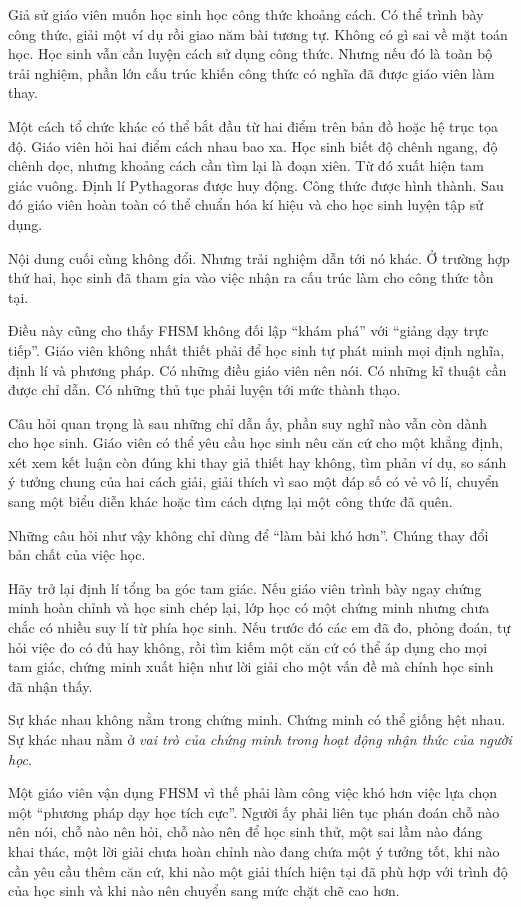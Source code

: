Giả sử giáo viên muốn học sinh học công thức khoảng cách. Có thể trình bày công thức, giải một ví dụ rồi giao năm bài tương tự. Không có gì sai về mặt toán học. Học sinh vẫn cần luyện cách sử dụng công thức. Nhưng nếu đó là toàn bộ trải nghiệm, phần lớn cấu trúc khiến công thức có nghĩa đã được giáo viên làm thay.

Một cách tổ chức khác có thể bắt đầu từ hai điểm trên bản đồ hoặc hệ trục tọa độ. Giáo viên hỏi hai điểm cách nhau bao xa. Học sinh biết độ chênh ngang, độ chênh dọc, nhưng khoảng cách cần tìm lại là đoạn xiên. Từ đó xuất hiện tam giác vuông. Định lí Pythagoras được huy động. Công thức được hình thành. Sau đó giáo viên hoàn toàn có thể chuẩn hóa kí hiệu và cho học sinh luyện tập sử dụng.

Nội dung cuối cùng không đổi. Nhưng trải nghiệm dẫn tới nó khác. Ở trường hợp thứ hai, học sinh đã tham gia vào việc nhận ra cấu trúc làm cho công thức tồn tại.

Điều này cũng cho thấy FHSM không đối lập ``khám phá'' với ``giảng dạy trực tiếp''. Giáo viên không nhất thiết phải để học sinh tự phát minh mọi định nghĩa, định lí và phương pháp. Có những điều giáo viên nên nói. Có những kĩ thuật cần được chỉ dẫn. Có những thủ tục phải luyện tới mức thành thạo.

Câu hỏi quan trọng là sau những chỉ dẫn ấy, phần suy nghĩ nào vẫn còn dành cho học sinh. Giáo viên có thể yêu cầu học sinh nêu căn cứ cho một khẳng định, xét xem kết luận còn đúng khi thay giả thiết hay không, tìm phản ví dụ, so sánh ý tưởng chung của hai cách giải, giải thích vì sao một đáp số có vẻ vô lí, chuyển sang một biểu diễn khác hoặc tìm cách dựng lại một công thức đã quên.

Những câu hỏi như vậy không chỉ dùng để ``làm bài khó hơn''. Chúng thay đổi bản chất của việc học.

Hãy trở lại định lí tổng ba góc tam giác. Nếu giáo viên trình bày ngay chứng minh hoàn chỉnh và học sinh chép lại, lớp học có một chứng minh nhưng chưa chắc có nhiều suy lí từ phía học sinh. Nếu trước đó các em đã đo, phỏng đoán, tự hỏi việc đo có đủ hay không, rồi tìm kiếm một căn cứ có thể áp dụng cho mọi tam giác, chứng minh xuất hiện như lời giải cho một vấn đề mà chính học sinh đã nhận thấy.

Sự khác nhau không nằm trong chứng minh. Chứng minh có thể giống hệt nhau. Sự khác nhau nằm ở \emph{vai trò của chứng minh trong hoạt động nhận thức của người học}.

Một giáo viên vận dụng FHSM vì thế phải làm công việc khó hơn việc lựa chọn một ``phương pháp dạy học tích cực''. Người ấy phải liên tục phán đoán chỗ nào nên nói, chỗ nào nên hỏi, chỗ nào nên để học sinh thử, một sai lầm nào đáng khai thác, một lời giải chưa hoàn chỉnh nào đang chứa một ý tưởng tốt, khi nào cần yêu cầu thêm căn cứ, khi nào một giải thích hiện tại đã phù hợp với trình độ của học sinh và khi nào nên chuyển sang mức chặt chẽ cao hơn.

